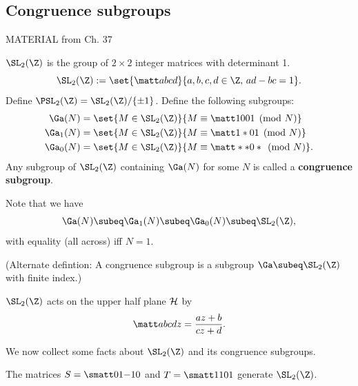 \subsection{Congruence subgroups}
MATERIAL from Ch. 37
\begin{df}
$\SL_2(\Z)$ is the group of $2\times 2$ integer matrices with determinant 1.
\[
\SL_2(\Z):=\set{\matt abcd}{a,b,c,d\in \Z, \, ad-bc=1}.
\]
Define $\PSL_2(\Z)=\SL_2(\Z)/\{\pm 1\}$.
Define the following subgroups:
\begin{align*}
\Ga(N)&=\set{M\in \SL_2(\Z)}{M\equiv \matt 1001\pmod{N}}\\
\Ga_1(N)&=\set{M\in \SL_2(\Z)}{M\equiv \matt 1*01\pmod{N}}\\
\Ga_0(N)&=\set{M\in \SL_2(\Z)}{M\equiv \matt **0* \pmod{N}}.
\end{align*}
Any subgroup of $\SL_2(\Z)$ containing $\Ga(N)$ for some $N$ is called a \textbf{congruence subgroup}.
\end{df}
Note that we have
\[
\Ga(N)\subeq \Ga_1(N)\subeq \Ga_0(N)\subeq \SL_2(\Z),
\]
with equality (all across) iff $N=1$.

(Alternate defintion: A congruence subgroup is a subgroup $\Ga\subeq \SL_2(\Z)$ with finite index.)
\begin{df}
$\SL_2(\Z)$ acts on the upper half plane $\cal H$ by
\[
\matt abcd z=\frac{az+b}{cz+d}.
\]
\end{df}

We now collect some facts about $\SL_2(\Z)$ and its congruence subgroups.
\begin{pr}
The matrices $S=\smatt 01{-1}0$ and $T=\smatt 1101$ generate $\SL_2(\Z)$.
\end{pr}

